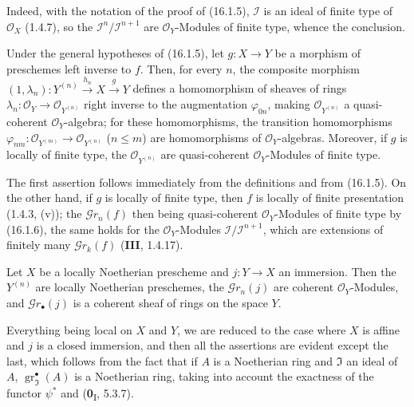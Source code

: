 Indeed, with the notation of the proof of (16.1.5), $\mathscr{I}$ is an
ideal of finite type of $\mathcal{O}_X$ (1.4.7), so the
$\mathscr{I}^n/\mathscr{I}^{n+1}$ are $\mathcal{O}_Y$-Modules of finite type,
whence the conclusion.

\begin{corollary}[16.1.7]
\label{IV.16.1.7}
Under the general hypotheses of (16.1.5), let $g:X\to Y$ be a morphism of
preschemes left inverse to $f$. Then, for every $n$, the composite morphism
$(1,\lambda_n):Y^{(n)}\xrightarrow{h_n}X\xrightarrow{g}Y$ defines a
homomorphism of sheaves of rings
$\lambda_n:\mathcal{O}_Y\to\mathcal{O}_{Y^{(n)}}$ right inverse to
the augmentation $\varphi_{0n}$, making $\mathcal{O}_{Y^{(n)}}$ a
quasi-coherent $\mathcal{O}_Y$-algebra; for these homomorphisms, the
transition homomorphisms
$\varphi_{nm}:\mathcal{O}_{Y^{(m)}}\to\mathcal{O}_{Y^{(n)}}$ \textup{($n\leq m$)} are
homomorphisms of $\mathcal{O}_Y$-algebras. Moreover, if $g$ is locally
of finite type, the $\mathcal{O}_{Y^{(n)}}$ are quasi-coherent
$\mathcal{O}_Y$-Modules of finite type.
\end{corollary}

The first assertion follows immediately from the definitions and from (16.1.5). On the
other hand, if $g$ is locally of finite type, then $f$ is locally of
finite presentation (1.4.3, (v)); the $\mathscr{G}r_n(f)$ then being
quasi-coherent $\mathcal{O}_Y$-Modules of finite type by (16.1.6), the same holds
for the $\mathcal{O}_Y$-Modules
$\mathscr{I}/\mathscr{I}^{n+1}$, which are extensions of finitely many
$\mathscr{G}r_k(f)$ (\textbf{III}, 1.4.17).

\begin{proposition}[16.1.8]
\label{IV.16.1.8}
Let $X$ be a locally Noetherian prescheme and $j:Y\to X$ an immersion. Then
the $Y^{(n)}$ are locally Noetherian preschemes, the
$\mathscr{G}r_n(j)$ are coherent $\mathcal{O}_Y$-Modules, and
$\mathscr{G}r_\bullet(j)$ is a coherent sheaf of rings on the space $Y$.
\end{proposition}

Everything being local on $X$ and $Y$, we are reduced to the case where $X$ is affine
and $j$ is a closed immersion, and then all the assertions are evident except the
last, which follows from the fact that if $A$ is a Noetherian ring and
$\mathfrak{I}$ an ideal of $A$, $\operatorname{gr}_{\mathfrak{I}}^\bullet(A)$
is a Noetherian ring, taking into account the exactness of the functor $\psi^*$ and
(\textbf{0}\textsubscript{I}, 5.3.7).

